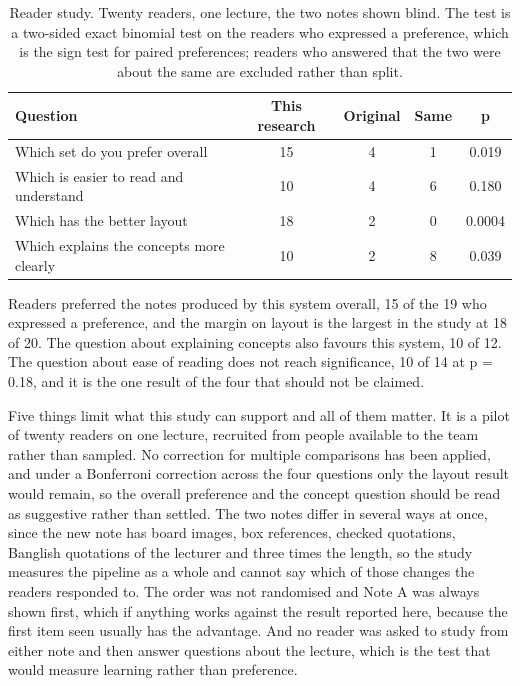 \begin{table}[htbp]
\centering
\caption[Reader study, 20 readers, one lecture]{Reader study. Twenty readers, one lecture, the two notes shown blind. The
test is a two-sided exact binomial test on the readers who expressed a preference, which
is the sign test for paired preferences; readers who answered that the two were about the
same are excluded rather than split.}
\label{tab:reader}
\small
\begin{tabular}{p{6.0cm}cccc}
\toprule
Question & This research & Original & Same & p \\
\midrule
Which set do you prefer overall & 15 & 4 & 1 & 0.019 \\
Which is easier to read and understand & 10 & 4 & 6 & 0.180 \\
Which has the better layout & 18 & 2 & 0 & 0.0004 \\
Which explains the concepts more clearly & 10 & 2 & 8 & 0.039 \\
\bottomrule
\end{tabular}
\end{table}

Readers preferred the notes produced by this system overall, 15 of the 19 who expressed a
preference, and the margin on layout is the largest in the study at 18 of 20. The
question about explaining concepts also favours this system, 10 of 12. The question about
ease of reading does not reach significance, 10 of 14 at p = 0.18, and it is the one
result of the four that should not be claimed.

Five things limit what this study can support and all of them matter. It is a pilot of
twenty readers on one lecture, recruited from people available to the team rather than
sampled. No correction for multiple comparisons has been applied, and under a Bonferroni
correction across the four questions only the layout result would remain, so the overall
preference and the concept question should be read as suggestive rather than settled. The
two notes differ in several ways at once, since the new note has board images, box
references, checked quotations, Banglish quotations of the lecturer and three times the
length, so the
study measures the pipeline as a whole and cannot say which of those changes the readers
responded to. The order was not randomised and Note A was always shown first, which if
anything works against the result reported here, because the first item seen usually has
the advantage. And no reader was asked to study from either note and then answer questions
about the lecture, which is the test that would measure learning rather than preference.

